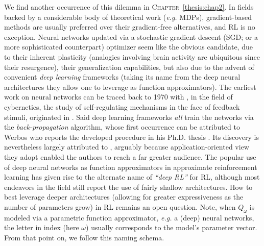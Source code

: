 We find another occurrence of this dilemma in \textsc{Chapter}~\ref{thesis:chap2}.
In fields backed by a considerable body of theoretical work (\textit{e.g.} MDPs),
gradient-based methods are usually preferred over their gradient-free alternatives, and RL is no exception.
Neural networks updated via a stochastic gradient descent (SGD; or a more sophisticated counterpart) optimizer
seem like the obvious candidate, due to their inherent plasticity (analogies involving brain activity are ubiquitous
since their resurgence), their generalization capabilities, but also due to
the advent of convenient \textit{deep learning} frameworks (taking its name from the deep neural architectures
they allow one to leverage as function approximators).
The earliest work on neural networks can be traced back to 1970 with \cite{Ivakhnenko1970-sx},
in the field of cybernetics,
the study of self-regulating mechanisms in the face of feedback stimuli, originated in \cite{Wiener1948-vo}.
Said deep learning frameworks \emph{all} train the networks via the \textit{back-propagation} algorithm,
whose first occurrence can be attributed to Werbos who reports the developed procedure in
his Ph.D. thesis \cite{Werbos1974-gb}.
Its discovery is nevertheless largely attributed to \cite{Rumelhart1986-ls},
arguably because application-oriented view they adopt enabled the authors to reach a far greater audience.
The popular use of deep neural networks as function approximators in approximate reinforcement learning
has given rise to the alternate name of \textit{``deep RL''} for RL,
although most endeavors in the field still report the use of fairly shallow architectures.
How to best leverage deeper architectures (allowing for greater expressiveness as the number of parameters grow)
in RL remains an open question.
Note, when $Q_\omega$ is modeled via a parametric function approximator,
\textit{e.g.} a (deep) neural networks,
the letter in index (here $\omega$) usually corresponds to the model's parameter vector.
From that point on, we follow this naming schema.


